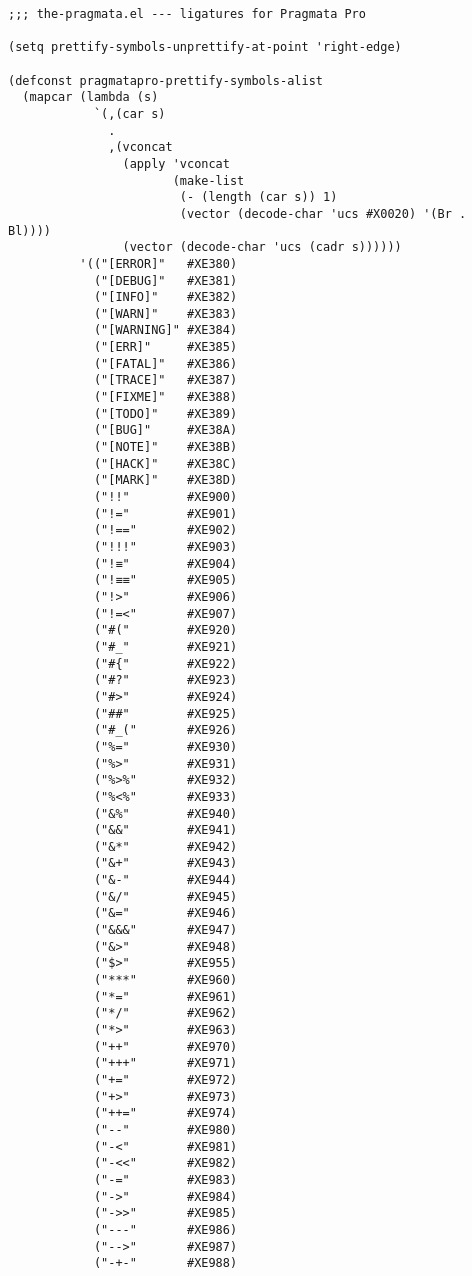 \documentclass[11pt]{article}
\begin{document}
\begin{verbatim}
;;; the-pragmata.el --- ligatures for Pragmata Pro

(setq prettify-symbols-unprettify-at-point 'right-edge)

(defconst pragmatapro-prettify-symbols-alist
  (mapcar (lambda (s)
            `(,(car s)
              .
              ,(vconcat
                (apply 'vconcat
                       (make-list
                        (- (length (car s)) 1)
                        (vector (decode-char 'ucs #X0020) '(Br . Bl))))
                (vector (decode-char 'ucs (cadr s))))))
          '(("[ERROR]"   #XE380)
            ("[DEBUG]"   #XE381)
            ("[INFO]"    #XE382)
            ("[WARN]"    #XE383)
            ("[WARNING]" #XE384)
            ("[ERR]"     #XE385)
            ("[FATAL]"   #XE386)
            ("[TRACE]"   #XE387)
            ("[FIXME]"   #XE388)
            ("[TODO]"    #XE389)
            ("[BUG]"     #XE38A)
            ("[NOTE]"    #XE38B)
            ("[HACK]"    #XE38C)
            ("[MARK]"    #XE38D)
            ("!!"        #XE900)
            ("!="        #XE901)
            ("!=="       #XE902)
            ("!!!"       #XE903)
            ("!≡"        #XE904)
            ("!≡≡"       #XE905)
            ("!>"        #XE906)
            ("!=<"       #XE907)
            ("#("        #XE920)
            ("#_"        #XE921)
            ("#{"        #XE922)
            ("#?"        #XE923)
            ("#>"        #XE924)
            ("##"        #XE925)
            ("#_("       #XE926)
            ("%="        #XE930)
            ("%>"        #XE931)
            ("%>%"       #XE932)
            ("%<%"       #XE933)
            ("&%"        #XE940)
            ("&&"        #XE941)
            ("&*"        #XE942)
            ("&+"        #XE943)
            ("&-"        #XE944)
            ("&/"        #XE945)
            ("&="        #XE946)
            ("&&&"       #XE947)
            ("&>"        #XE948)
            ("$>"        #XE955)
            ("***"       #XE960)
            ("*="        #XE961)
            ("*/"        #XE962)
            ("*>"        #XE963)
            ("++"        #XE970)
            ("+++"       #XE971)
            ("+="        #XE972)
            ("+>"        #XE973)
            ("++="       #XE974)
            ("--"        #XE980)
            ("-<"        #XE981)
            ("-<<"       #XE982)
            ("-="        #XE983)
            ("->"        #XE984)
            ("->>"       #XE985)
            ("---"       #XE986)
            ("-->"       #XE987)
            ("-+-"       #XE988)

\end{verbatim}
\end{document}
